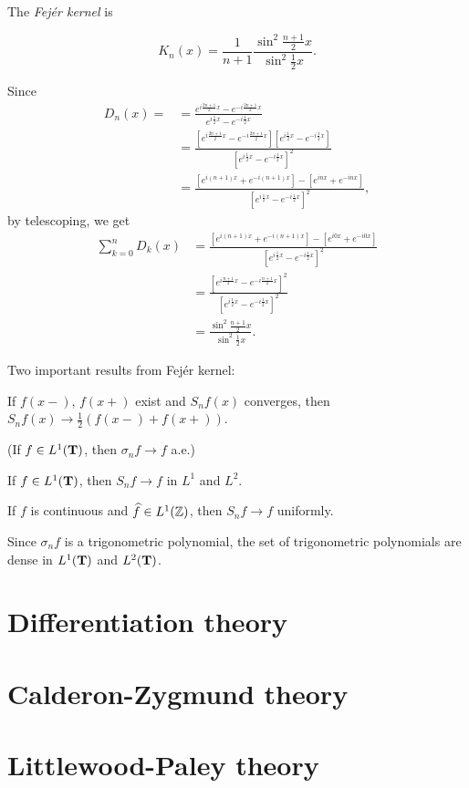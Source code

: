 \documentclass{../crs}
\begin{document}
\begin{defn}
The \emph{Fej\'er kernel} is
\end{defn}
\begin{thm}
\[K_n(x)=\frac1{n+1}\frac{\sin^2\frac{n+1}2x}{\sin^2\frac12x}.\]
\end{thm}
\begin{pf}
Since
\begin{align*}
D_n(x)=
&=\frac{e^{i\frac{2n+1}2x}-e^{-i\frac{2n+1}2x}}{e^{i\frac12x}-e^{-i\frac12x}}\\
&=\frac{[e^{i\frac{2n+1}2x}-e^{-i\frac{2n+1}2x}][e^{i\frac12x}-e^{-i\frac12x}]}{[e^{i\frac12x}-e^{-i\frac12x}]^2}\\
&=\frac{[e^{i(n+1)x}+e^{-i(n+1)x}]-[e^{inx}+e^{-inx}]}{[e^{i\frac12x}-e^{-i\frac12x}]^2},
\end{align*}
by telescoping, we get
\begin{align*}
\sum_{k=0}^nD_k(x)
&=\frac{[e^{i(n+1)x}+e^{-i(n+1)x}]-[e^{i0x}+e^{-i0x}]}{[e^{i\frac12x}-e^{-i\frac12x}]^2}\\
&=\frac{[e^{i\frac{n+1}2x}-e^{-i\frac{n+1}2x}]^2}{[e^{i\frac12x}-e^{-i\frac12x}]^2}\\
&=\frac{\sin^2\frac{n+1}2x}{\sin^2\frac12x}.
\end{align*}
\end{pf}

Two important results from Fej\'er kernel:
\begin{cond}
\item If $f(x-)$, $f(x+)$ exist and $S_nf(x)$ converges, then $S_nf(x)\to\frac12(f(x-)+f(x+))$.
\item (If $f\in L^1(\mathbf{T})$, then $\sigma_nf\to f$ a.e.)

\item If $f\in L^1(\mathbf{T})$, then $S_nf\to f$ in $L^1$ and $L^2$.
\item If $f$ is continuous and $\widehat{f}\in L^1(\mathbb{Z})$, then $S_nf\to f$ uniformly.
\item Since $\sigma_nf$ is a trigonometric polynomial, the set of trigonometric polynomials are dense in $L^1(\mathbf{T})$ and $L^2(\mathbf{T})$.
\end{cond}





\chapter{Differentiation theory}






\chapter{Calderon-Zygmund theory}



\chapter{Littlewood-Paley theory}
\end{document}
